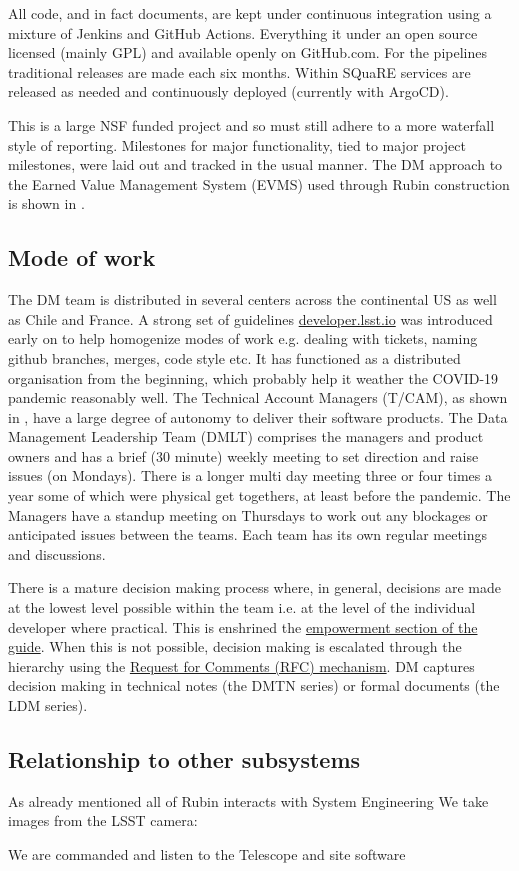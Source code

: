 All code, and in fact documents, are kept under continuous integration using a mixture of Jenkins and GitHub Actions.
Everything it under an open source licensed (mainly GPL) and available openly on GitHub.com.
For the pipelines traditional releases are made each six months.
Within SQuaRE services are released as needed and continuously deployed (currently with ArgoCD).

This is a large NSF funded project and so must still adhere to a more waterfall style of reporting.
Milestones for major functionality, tied to major project milestones, were laid out and tracked in the usual manner.
The DM approach to the Earned Value Management System (EVMS) used through Rubin construction is shown in \cite {DMTN-020}.

\subsection{Mode of work}\label{sec:mode}
The DM  team is distributed in several centers across the continental US as well as Chile and France.
A strong set of guidelines \href{https:\\developer.lsst.io}{developer.lsst.io} was introduced early on to help homogenize modes of work e.g. dealing with tickets, naming github branches, merges, code style etc.
It has functioned as a distributed organisation from the beginning, which probably help it weather the COVID-19 pandemic reasonably well.
The Technical Account Managers (T/CAM), as shown in , have a large degree of autonomy to deliver their software products.
The Data Management Leadership Team (DMLT) comprises the managers and product owners and has a brief (30 minute) weekly meeting to set direction and raise issues (on Mondays).
There is a longer multi day meeting three or four times a year some of which were physical get togethers, at least before the pandemic.
The Managers have a standup meeting on Thursdays to work out any blockages or anticipated issues between the teams.
Each team has its own regular meetings and discussions.

There is a mature decision making process where, in general, decisions are made at the lowest level possible within the team i.e. at the level of the individual developer where practical. This is enshrined the \href{https://developer.lsst.io/team/empowerment.html}{empowerment section of the guide}.
When this is not possible, decision making is escalated through the hierarchy using  the \href{https://developer.lsst.io/communications/rfc.html}{Request for Comments (RFC) mechanism}.
DM captures decision making in technical notes (the DMTN series) or formal documents (the LDM series).


\subsection{Relationship to other subsystems}

As already mentioned all of Rubin interacts with System Engineering
   We take images from the  LSST camera: \cite{2010SPIE.7735E..0JK}

   We are commanded and listen to the  Telescope  and site software  \cite{2014SPIE.9145E..1AG}
